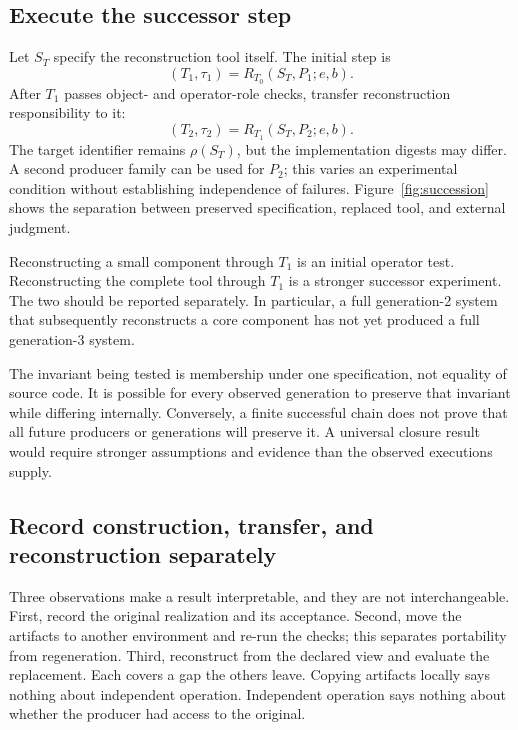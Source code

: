 \documentclass[10pt,twocolumn,letterpaper]{article}
\begin{document}
\subsection{Execute the successor step}
Let $S_T$ specify the reconstruction tool itself. The initial step is
\begin{equation}
 (T_1,\tau_1)=R_{T_0}(S_T,P_1;e,b).
\end{equation}
After $T_1$ passes object- and operator-role checks, transfer reconstruction responsibility to it:
\begin{equation}
 (T_2,\tau_2)=R_{T_1}(S_T,P_2;e,b).
\end{equation}
The target identifier remains $\rho(S_T)$, but the implementation digests may differ. A second producer family can be used for $P_2$; this varies an experimental condition without establishing independence of failures. Figure~\ref{fig:succession} shows the separation between preserved specification, replaced tool, and external judgment.

Reconstructing a small component through $T_1$ is an initial operator test. Reconstructing the complete tool through $T_1$ is a stronger successor experiment. The two should be reported separately. In particular, a full generation-2 system that subsequently reconstructs a core component has not yet produced a full generation-3 system.

The invariant being tested is membership under one specification, not equality of source code. It is possible for every observed generation to preserve that invariant while differing internally. Conversely, a finite successful chain does not prove that all future producers or generations will preserve it. A universal closure result would require stronger assumptions and evidence than the observed executions supply.

\subsection{Record construction, transfer, and reconstruction separately}
Three observations make a result interpretable, and they are not interchangeable. First, record the original realization and its acceptance. Second, move the artifacts to another environment and re-run the checks; this separates portability from regeneration. Third, reconstruct from the declared view and evaluate the replacement. Each covers a gap the others leave. Copying artifacts locally says nothing about independent operation. Independent operation says nothing about whether the producer had access to the original.
\end{document}
